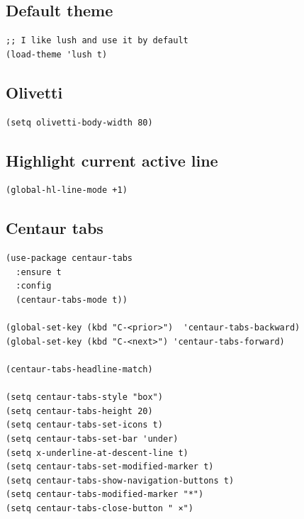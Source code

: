 \documentclass[10pt]{article}
\begin{document}
\subsection{Default theme}
\label{sec:org42fc5a1}
\begin{verbatim}
;; I like lush and use it by default
(load-theme 'lush t)
\end{verbatim}
\subsection{Olivetti}
\label{sec:org10bd5e4}
\begin{verbatim}
(setq olivetti-body-width 80)
\end{verbatim}
\subsection{Highlight current active line}
\label{sec:org3adc294}
\begin{verbatim}
(global-hl-line-mode +1)
\end{verbatim}
\subsection{Centaur tabs}
\label{sec:orgdd24dec}
\begin{verbatim}
(use-package centaur-tabs
  :ensure t
  :config
  (centaur-tabs-mode t))

(global-set-key (kbd "C-<prior>")  'centaur-tabs-backward)
(global-set-key (kbd "C-<next>") 'centaur-tabs-forward)

(centaur-tabs-headline-match)

(setq centaur-tabs-style "box")
(setq centaur-tabs-height 20)
(setq centaur-tabs-set-icons t)
(setq centaur-tabs-set-bar 'under)
(setq x-underline-at-descent-line t)
(setq centaur-tabs-set-modified-marker t)
(setq centaur-tabs-show-navigation-buttons t)
(setq centaur-tabs-modified-marker "*")
(setq centaur-tabs-close-button " ×")
\end{verbatim}
\end{document}
